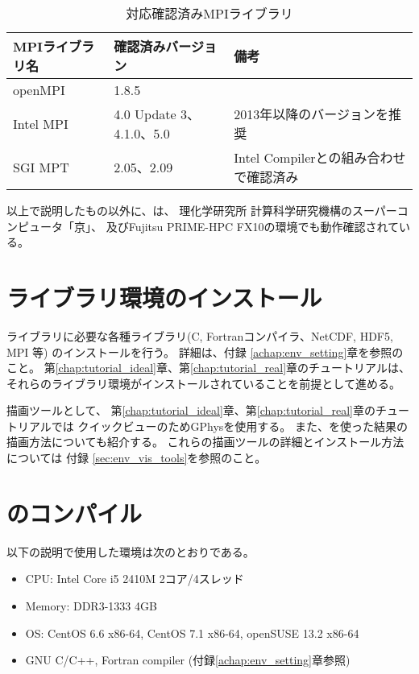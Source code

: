 \begin{table}[htb]
\begin{center}
\caption{対応確認済みMPIライブラリ}
\begin{tabularx}{150mm}{|l|l|X|} \hline
 \rowcolor[gray]{0.9} MPIライブラリ名 & 確認済みバージョン & 備考 \\ \hline
 openMPI   & 1.8.5                    & \\ \hline
 Intel MPI & 4.0 Update 3、4.1.0、5.0 & 2013年以降のバージョンを推奨 \\ \hline
 SGI MPT   & 2.05、2.09               & Intel Compilerとの組み合わせで確認済み \\ \hline
\end{tabularx}
\label{tab:compatible_mpi}
\end{center}
\end{table}

以上で説明したもの以外に、\scalelib は、
理化学研究所 計算科学研究機構のスーパーコンピュータ「京」、
及びFujitsu PRIME-HPC FX10の環境でも動作確認されている。


\section{ライブラリ環境のインストール} \label{sec:inst_env}
\scalelib ライブラリに必要な各種ライブラリ(C, Fortranコンパイラ、NetCDF, HDF5, MPI 等)
のインストールを行う。
詳細は、付録 \ref{achap:env_setting}章を参照のこと。
第\ref{chap:tutorial_ideal}章、第\ref{chap:tutorial_real}章のチュートリアルは、
それらのライブラリ環境がインストールされていることを前提として進める。

描画ツールとして、
第\ref{chap:tutorial_ideal}章、第\ref{chap:tutorial_real}章のチュートリアルでは
クイックビューのためGPhysを使用する。
また、\grads を使った結果の描画方法についても紹介する。
これらの描画ツールの詳細とインストール方法については
付録 \ref{sec:env_vis_tools}を参照のこと。



\section{\scalelib のコンパイル} \label{sec:scale_compile}

以下の説明で使用した環境は次のとおりである。
\begin{itemize}
\item CPU: Intel Core i5 2410M 2コア/4スレッド
\item Memory: DDR3-1333 4GB
\item OS: CentOS 6.6 x86-64, CentOS 7.1 x86-64, openSUSE 13.2 x86-64
\item GNU C/C++, Fortran compiler (付録\ref{achap:env_setting}章参照)
\end{itemize}

